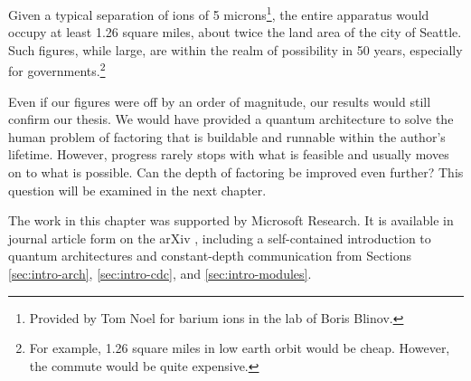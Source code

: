 Given a typical
separation of ions of 5 microns\footnote{Provided
by Tom Noel for barium ions in the lab of Boris Blinov.},
the entire apparatus would occupy at least 1.26
square miles, about twice the land area of the city
of Seattle. Such figures, while large, are
within the realm of possibility in 50 years, especially
for governments.\footnote{For example,
1.26 square miles in low earth orbit would be cheap.
However, the commute would be quite expensive.}

Even if our figures were off by an order of magnitude,
our results would still confirm our thesis. We
would have provided a quantum architecture to solve
the human problem of factoring that is
buildable and runnable within the author's lifetime.
However, progress rarely stops with what is
feasible and usually moves on to what is possible.
Can the depth of factoring be improved even further?
This question will be examined
in the next chapter.

The work in this chapter was supported by
Microsoft Research. It is available in journal article
form on the arXiv \cite{Pham2012}, including
a self-contained introduction to quantum architectures
and constant-depth communication from
Sections \ref{sec:intro-arch}, \ref{sec:intro-cdc},
and \ref{sec:intro-modules}.